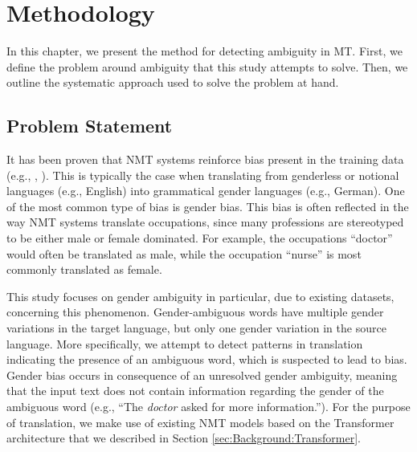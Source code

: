 \chapter{Methodology}
\label{ch:Methodology}


In this chapter, we present the method for detecting ambiguity in MT. First, we define the problem around ambiguity that this study attempts to solve. Then, we outline the systematic approach used to solve the problem at hand.

\section{Problem Statement}
\label{sec:Methodology:Problem}

It has been proven that NMT systems reinforce bias present in the training data (e.g., \citet{Prates_2019}, \citet{Stanovsky_2019}). This is typically the case when translating from genderless or notional languages (e.g., English) into grammatical gender languages (e.g., German). One of the most common type of bias is gender bias. 
This bias is often reflected in the way NMT systems translate occupations, since many professions are stereotyped to be either male or female dominated. For example, the occupations “doctor” would often be translated as male, while the occupation “nurse” is most commonly translated as female. 

This study focuses on gender ambiguity in particular, due to existing datasets, concerning this phenomenon. Gender-ambiguous words have multiple gender variations in the target language, but only one gender variation in the source language. More specifically, we attempt to detect patterns in translation indicating the presence of an ambiguous word, which is suspected to lead to bias. Gender bias occurs in consequence of an unresolved gender ambiguity, meaning that the input text does not contain information regarding the gender of the ambiguous word (e.g., “The \textit{doctor} asked for more information.”). For the purpose of translation, we make use of existing NMT models based on the Transformer architecture that we described in Section \ref{sec:Background:Transformer}.


